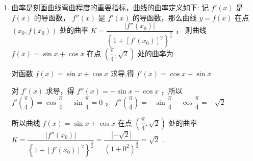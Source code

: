 \begin{enumerate}
\begin{enumerate}
\begin{jieda}
            则 $f\left( x\right)$ 在 $\left( {0,\dfrac{\pi }{2}}\right)$ 上恒有 ${f}''\left( x\right)  < 0$ ,故 ${B}$ 错误;
            
            对于 ${C} : f\left( x\right)  =  - {x}^{3} + {2x} - 1,f'\left( x\right)  =  - 3{x}^{2} + 2,{f}''\left( x\right)  =  - {6x}$ ,
            
            则 $f\left( x\right)$ 在 $\left( {0,\dfrac{{\pi }}{2}}\right)$ 上恒有 ${f}''\left( x\right)  < 0$ ,故 ${C}$ 错误;
            
            对于 ${D} : f\left( x\right)  =  - x{{e}}^{-x},f'\left( x\right)  =  - {{e}}^{-x} + x{{e}}^{-x},f''\left( x\right)  = \left( {2 - x}\right) {{e}}^{-x}$ ,
            
            则 $f\left( x\right)$ 在 $\left( {0,\dfrac{{\pi }}{2}}\right)$ 上恒有 ${f}''\left( x\right)  > 0$ ,故 ${D}$ 正确.
        \end{jieda}
        
        \item 曲率是刻画曲线弯曲程度的重要指标，曲线的曲率定义如下: 记 $f'\left( x\right)$ 是 $f\left( x\right)$ 的导函数， $f''\left( x\right)$ 是 $f'\left( x\right)$ 的导函数，那么曲线 $y = f\left( x\right)$ 在点 $\left( {{x}_{0},f\left( {x}_{0}\right) }\right)$ 处的曲率 $K = \dfrac{\left| f''\left( {x}_{0}\right) \right| }{{\left\{  1 + {\left\lbrack  f'\left( {x}_{0}\right) \right\rbrack  }^{2}\right\}  }^{\frac{3}{2}}}$ ， 则曲线 $f\left( x\right)  = \sin x + \cos x$ 在点 $\left( {\dfrac{\pi }{4},\sqrt{2}}\right)$ 处的曲率为
        \begin{jieda}
            对函数 $f\left( x\right)  = \sin x + \cos x$ 求导,得 $f'\left( x\right)  = \cos x - \sin x$ 
            
            对 $f'\left( x\right)$ 求导，得 $f''\left( x\right)  =  - \sin x - \cos x$ ，所以 $f'\left( \dfrac{\pi }{4}\right)  = \cos \dfrac{\pi }{4} - \sin \dfrac{\pi }{4} = 0$ ， $f''\left( \dfrac{\pi }{4}\right)  =  - \sin \dfrac{\pi }{4} - \cos \dfrac{\pi }{4} =  - \sqrt{2}$
            
            所以曲线 $f\left( x\right)  = \sin x + \cos x$ 在点 $\left( {\dfrac{\pi }{4},\sqrt{2}}\right)$ 处的曲率 $K = \dfrac{\left| f''\left( {x}_{0}\right) \right| }{{\left\{  1 + {\left\lbrack  f'\left( {x}_{0}\right) \right\rbrack  }^{2}\right\}  }^{\frac{3}{2}}} = \dfrac{\left| -\sqrt{2}\right| }{{\left( 1 + {0}^{2}\right) }^{\frac{3}{2}}} = \sqrt{2}$ .
        \end{jieda}


\end{enumerate}
\end{enumerate}
